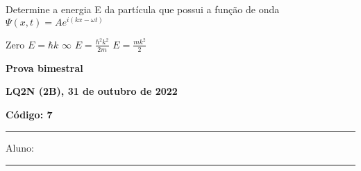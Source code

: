 \documentclass[12pt, addpoints]{exam}
\begin{document}
        \begin{questions}
\begin{multicols*}{2}
\question[20] Determine a energia E da partícula que possui a função de onda $\Psi(x,t)=Ae^{i(kx-\omega t)}$

\begin{choices}
\choice Zero \choice $E=\hbar k$ \choice $\infty$ \choice $E=\frac{\hbar^2k^2}{2m}$ \choice $E = \frac{mk^2}{2}$ \end{choices}
\end{multicols*}
\end{questions}
\newpage
        \begin{minipage}[b]{0.75\linewidth}
            \begin{flushleft}
                {\bf \large Prova bimestral}
            \end{flushleft}
            \begin{flushleft}
                {\bf \large LQ2N (2B), 31 de outubro de 2022}
            \end{flushleft}
        \end{minipage}
        \begin{minipage}[b]{0.20\linewidth}
            \begin{flushright}
                {\bf \large Código: 7}
            \end{flushright}
        \end{minipage}
        \vspace{0.5cm} \hrule \vspace{0.5cm}
        \begin{minipage}{0.75\linewidth}
            Aluno:
        \end{minipage}
        \vspace{0.5cm} \hrule \vspace{0.5cm}
\end{document}
